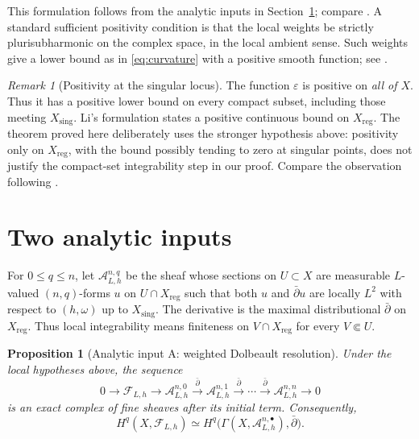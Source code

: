 \documentclass[11pt,a4paper,reqno]{amsart}
\newtheorem{proposition}[theorem]{Proposition}
\theoremstyle{definition}
\theoremstyle{remark}
\newtheorem{remark}[theorem]{Remark}
\numberwithin{equation}{section}
\newcommand{\FF}{\mathcal F}
\newcommand{\scrA}{\mathscr A}
\newcommand{\reg}{\mathrm{reg}}
\newcommand{\sing}{\mathrm{sing}}
\newcommand{\db}{\bar\partial}
\begin{document}
This formulation follows from the analytic inputs in
Section~\ref{sec:inputs}; compare \cite[Theorem~1.4]{Watanabe}.
A standard sufficient positivity condition is that the local weights be
strictly plurisubharmonic on the complex space, in the local ambient
sense. Such weights give a lower bound as in \eqref{eq:curvature} with a
positive smooth function; see \cite[Proposition~3.1]{Watanabe}.

\begin{remark}[Positivity at the singular locus]\label{rem:positivity}
The function $\varepsilon$ is positive on \emph{all of $X$}. Thus it has
a positive lower bound on every compact subset, including those meeting
$X_{\sing}$. Li's formulation \cite[Theorem~2.3]{Li} states a positive
continuous bound on $X_{\reg}$. The theorem proved here deliberately
uses the stronger hypothesis above: positivity only on $X_{\reg}$,
with the bound possibly tending to zero at singular points, does not
justify the compact-set integrability step in our proof. Compare the
observation following \cite[Theorem~6.4]{Watanabe}.
\end{remark}

\section{Two analytic inputs}
\label{sec:inputs}

For $0\leq q\leq n$, let $\scrA^{n,q}_{L,h}$ be the sheaf whose sections on
$U\subset X$ are measurable $L$-valued $(n,q)$-forms $u$ on
$U\cap X_{\reg}$ such that both $u$ and $\db u$ are locally $L^2$ with
respect to $(h,\omega)$ up to $X_{\sing}$. The derivative is the maximal
distributional $\db$ on $X_{\reg}$. Thus local integrability means
finiteness on $V\cap X_{\reg}$ for every $V\Subset U$.

\begin{proposition}[Analytic input A: weighted Dolbeault resolution]
\label{prop:resolution}
Under the local hypotheses above, the sequence
\begin{equation}\label{eq:fine}
0\longrightarrow\FF_{L,h}\longrightarrow\scrA^{n,0}_{L,h}
\xrightarrow{\db}\scrA^{n,1}_{L,h}\xrightarrow{\db}\cdots
\xrightarrow{\db}\scrA^{n,n}_{L,h}\longrightarrow0
\end{equation}
is an exact complex of fine sheaves after its initial term. Consequently,
\begin{equation}\label{eq:cohomology}
 H^q(X,\FF_{L,h})\simeq
 H^q\bigl(\Gamma(X,\scrA^{n,\bullet}_{L,h}),\db\bigr).
\end{equation}
\end{proposition}
\end{document}
